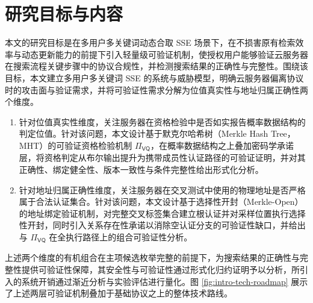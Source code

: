 \section{研究目标与内容}
本文的研究目标是在多用户多关键词动态合取 SSE 场景下，在不损害原有检索效率与动态更新能力的前提下引入轻量级可验证机制，使授权用户能够验证云服务器在搜索流程关键步骤中的协议合规性，并检测搜索结果的正确性与完整性。围绕该目标，本文建立多用户多关键词 SSE 的系统与威胁模型，明确云服务器偏离协议时的攻击面与验证需求，并将可验证性需求分解为位值真实性与地址归属正确性两个维度。
\begin{enumerate}
  \item 针对位值真实性维度，关注服务器在资格检验中是否如实报告概率数据结构的判定位值。针对该问题，本文设计基于默克尔哈希树（Merkle Hash Tree，MHT）的可验证资格检验机制 $\Pi_{\mathsf{VQ}}$，在概率数据结构之上叠加密码学承诺层，将资格判定从布尔输出提升为携带成员性认证路径的可验证证明，并对其正确性、绑定健全性、版本一致性与条件完整性给出形式化分析。
  \item 针对地址归属正确性维度，关注服务器在交叉测试中使用的物理地址是否严格属于合法认证集合。针对该问题，本文设计基于选择性开封（Merkle-Open）的地址绑定验证机制，对完整交叉标签集合建立根认证并对采样位置执行选择性开封，同时引入关系存在性承诺以消除空认证分支的可验证性缺口，并给出与 $\Pi_{\mathsf{VQ}}$ 在全执行路径上的组合可验证性分析。
\end{enumerate}

上述两个维度的有机组合在主项候选枚举完整的前提下，为搜索结果的正确性与完整性提供可验证性保障，其安全性与可验证性通过形式化归约证明予以分析，所引入的系统开销通过渐近分析与实验评估进行量化。图 \ref{fig:intro-tech-roadmap} 展示了上述两层可验证机制叠加于基础协议之上的整体技术路线。

